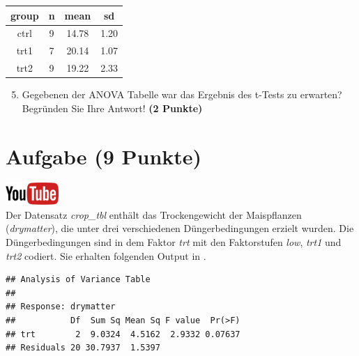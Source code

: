 \documentclass[a4paper, 10pt]{scrartcl}\usepackage[]{graphicx}\usepackage[]{xcolor}
\makeatletter
\newenvironment{kframe}{%
 \def\at@end@of@kframe{}%
 \ifinner\ifhmode%
  \def\at@end@of@kframe{\end{minipage}}%
  \begin{minipage}{\columnwidth}%
 \fi\fi%
 \def\FrameCommand##1{\hskip\@totalleftmargin \hskip-\fboxsep
 \colorbox{shadecolor}{##1}\hskip-\fboxsep
     \hskip-\linewidth \hskip-\@totalleftmargin \hskip\columnwidth}%
 \MakeFramed {\advance\hsize-\width
   \@totalleftmargin\z@ \linewidth\hsize
   \@setminipage}}%
 {\par\unskip\endMakeFramed%
 \at@end@of@kframe}
\newenvironment{knitrout}{}{} %
\makeatother
\begin{document}
\begin{knitrout}
\color{fgcolor}\begin{table}[!h]
\centering
\begin{tabular}{cccc}
\toprule
group & n & mean & sd\\
\midrule
ctrl & 9 & 14.78 & 1.20\\
trt1 & 7 & 20.14 & 1.07\\
trt2 & 9 & 19.22 & 2.33\\
\bottomrule
\end{tabular}
\end{table}

\end{knitrout}

\begin{enumerate}
  \setcounter{enumi}{4}
\item Gegebenen der ANOVA Tabelle war das Ergebnis des t-Tests zu erwarten?
  Begr{\"u}nden Sie Ihre Antwort! \textbf{(2 Punkte)}
\end{enumerate}

 
\clearpage

\section{Aufgabe \hfill (9 Punkte)}

\hfill\href{https://youtu.be/d4CFR2MKX7I}{\includegraphics[width =
  2cm]{img/youtube}}\\[1Ex]

Der Datensatz \textit{crop\_tbl} enth{\"a}lt das Trockengewicht der
Maispflanzen (\textit{drymatter}), die unter drei 
verschiedenen D{\"u}ngerbedingungen erzielt wurden. Die D{\"u}ngerbedingungen sind in dem Faktor
\textit{trt} mit den Faktorstufen \textit{low},  \textit{trt1} und
 \textit{trt2} codiert. Sie erhalten folgenden Output in \Rlogo.

\begin{knitrout}
\color{fgcolor}\begin{kframe}
\begin{verbatim}
## Analysis of Variance Table
## 
## Response: drymatter
##           Df  Sum Sq Mean Sq F value  Pr(>F)
## trt        2  9.0324  4.5162  2.9332 0.07637
## Residuals 20 30.7937  1.5397
\end{verbatim}
\end{kframe}
\end{knitrout}
\end{document}
